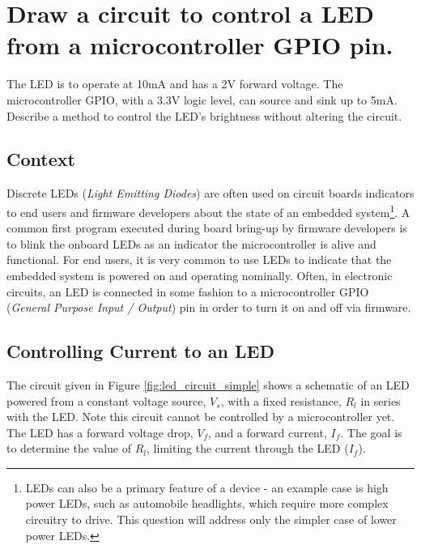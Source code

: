 \documentclass[main.tex]{subfiles}
\begin{document}
\section{Draw a circuit to control a LED from a microcontroller GPIO pin.} \label{section:led} 

The LED is to operate at 10mA and has a 2V forward voltage. The microcontroller GPIO, with a 3.3V logic level, can source and sink up to 5mA. Describe a method to control the LED’s brightness without altering the circuit.

\spoilerline

\subsection{Context}
Discrete LEDs (\textit{Light Emitting Diodes}) are often used on circuit boards indicators to end users and firmware developers about the state of an embedded system\footnote{LEDs can also be a primary feature of a device - an example case is high power LEDs, such as automobile headlights, which require more complex circuitry to drive. This question will address only the simpler case of lower power LEDs.}. A common first program executed during board bring-up by firmware developers is to blink the onboard LEDs as an indicator the microcontroller is alive and functional. For end users, it is very common to use LEDs to indicate that the embedded system is powered on and operating nominally. Often, in electronic circuits, an LED is connected in some fashion to a microcontroller GPIO (\textit{General Purpose Input / Output}) pin in order to turn it on and off via firmware. 

\subsection{Controlling Current to an LED} 
\noindent The circuit given in Figure \ref{fig:led_circuit_simple} shows a schematic of an LED powered from a constant voltage source, $V_s$, with a fixed resistance, $R_l$ in series with the LED. Note this circuit cannot be controlled by a microcontroller yet. The LED has a forward voltage drop, $V_f$, and a forward current, $I_f$. The goal is to determine the value of $R_l$, limiting the current through the LED ($I_f$).
\end{document}

